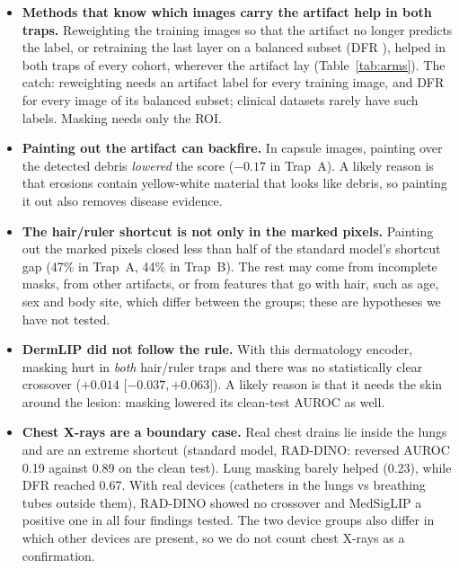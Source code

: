 \documentclass[11pt,a4paper]{article}
\begin{document}
\begin{itemize}[leftmargin=1.2em,itemsep=2pt]
\item \textbf{Methods that know which images carry the artifact help in both traps.} Reweighting the training images
so that the artifact no longer predicts the label, or retraining the last layer on a balanced subset (DFR
\citep{kirichenko2023dfr}), helped in both traps of every cohort, wherever the artifact lay (Table~\ref{tab:arms}). The
catch: reweighting needs an artifact label for every training image, and DFR for every image of its balanced subset;
clinical datasets rarely have such labels. Masking needs only the ROI.
\item \textbf{Painting out the artifact can backfire.} In capsule images, painting over the detected debris
\emph{lowered} the score ($-0.17$ in Trap~A). A likely reason is that erosions contain yellow-white material that
looks like debris, so painting it out also removes disease evidence.
\item \textbf{The hair/ruler shortcut is not only in the marked pixels.} Painting out the marked pixels closed less than
half of the standard model's shortcut gap (47\% in Trap~A, 44\% in Trap~B). The rest may come from incomplete masks,
from other artifacts, or from features that go with hair, such as age, sex and body site, which differ between the
groups; these are hypotheses we have not tested.
\item \textbf{DermLIP did not follow the rule.} With this dermatology encoder, masking hurt in \emph{both} hair/ruler
traps and there was no statistically clear crossover ($+0.014$ [$-0.037, +0.063$]). A likely reason is that it needs the skin around the lesion: masking lowered its clean-test
AUROC as well.
\item \textbf{Chest X-rays are a boundary case.} Real chest drains lie inside the lungs and are an extreme shortcut
(standard model, RAD-DINO: reversed AUROC 0.19 against 0.89 on the clean test). Lung masking barely helped (0.23),
while DFR reached 0.67. With real devices (catheters in the lungs vs breathing tubes outside them), RAD-DINO showed no
crossover and MedSigLIP a positive one in all four findings tested. The two device groups also differ in which other
devices are present, so we do not count chest X-rays as a confirmation.
\end{itemize}
\end{document}
